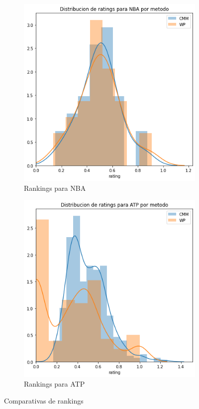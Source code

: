 \documentclass[a4paper]{article}
\begin{document}
\begin{figure}[H]
    \begin{subfigure}{.5\textwidth}
        \includegraphics[scale=0.5]{img/reales/nba-ranking.png}
        \caption{Rankings para NBA}
        \label{rankings-nba}
    \end{subfigure}
    \begin{subfigure}{.5\textwidth}
        \includegraphics[scale=0.5]{img/reales/atp-ranking.png}
        \caption{Rankings para ATP}
        \label{rankings-atp}
    \end{subfigure}
    \caption{Comparativas de rankings}
\end{figure}
\end{document}
